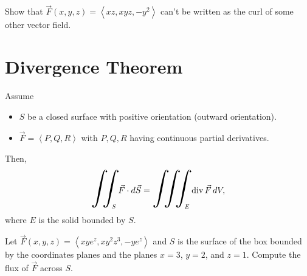 \documentclass[20pt,a4paper]{extarticle}
\newcommand{\hiint}[1]{\scalebox{2}{$\displaystyle\iint_{\scalebox{0.35}{$#1$}}$}\,}
\newcommand{\hiiint}[1]{\scalebox{2}{$\displaystyle\iiint_{\scalebox{0.35}{$#1$}}$}\,}
\renewcommand{\div}{\mathrm{div}\,}
\newcounter{example}[section]
\newcounter{theorem}
\begin{document}
\vspace*{0.5cm}

\begin{example}
Show that $\vec{F} (x, y, z) = \left\langle xz , xyz , -y^2 \right\rangle$ can't be written as the curl of some other vector field.
\end{example}

\begin{notes}

\end{notes}

\newpage 

\section{Divergence Theorem}

\begin{theorem}
Assume
	\begin{itemize}
	\item $S$ be a closed surface with positive orientation (outward orientation).
	\item $\vec{F} = \left\langle P , Q, R \right\rangle$ with $P, Q, R$ having continuous partial derivatives.
	\end{itemize}
Then,
	\[
		\hiint{S} \vec{F} \cdot d \vec{S} = \hiiint{E} \div \vec{F} \, dV ,
	\]
where $E$ is the solid bounded by $S$.
\end{theorem}

\vspace*{0.3cm}

\begin{example}
Let $\vec{F} (x, y, z) = \left\langle xye^z , xy^2z^3, -ye^z \right\rangle$ and $S$ is the surface of the box bounded by the coordinates planes and the planes $x = 3$, $y= 2$, and $z = 1$. Compute the flux of $\vec{F}$ across $S$.
\end{example}

\begin{notes}

\end{notes}

\newpage 

\phantom{2} 
\end{document}

